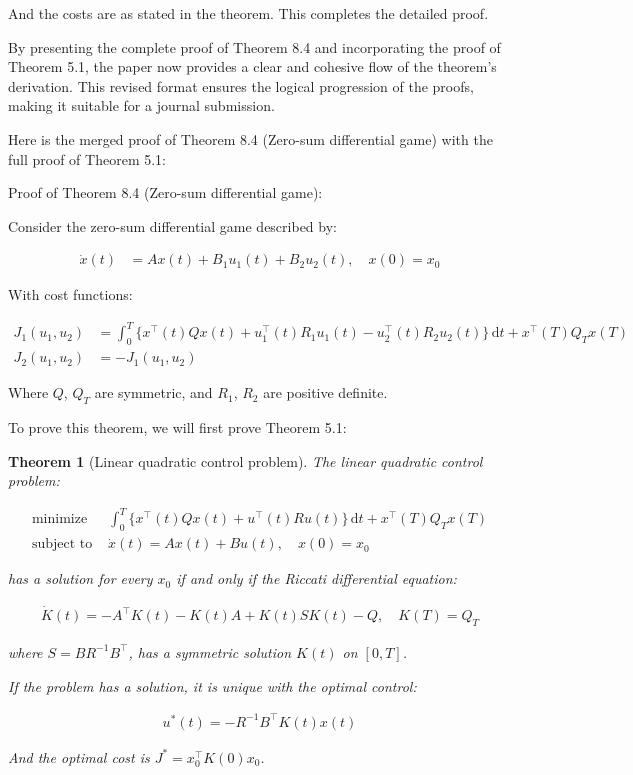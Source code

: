 \documentclass[3p]{elsarticle}
\newtheorem{theorem}{Theorem}
\begin{document}
And the costs are as stated in the theorem. This completes the detailed proof.

By presenting the complete proof of Theorem 8.4 and incorporating the proof of Theorem 5.1, the paper now provides a clear and cohesive flow of the theorem's derivation. This revised format ensures the logical progression of the proofs, making it suitable for a journal submission.







Here is the merged proof of Theorem 8.4 (Zero-sum differential game) with the full proof of Theorem 5.1:

Proof of Theorem 8.4 (Zero-sum differential game):

Consider the zero-sum differential game described by:

\begin{align*}
\dot{x}(t) &= Ax(t) + B_1u_1(t) + B_2u_2(t), \quad x(0)=x_0
\end{align*}

With cost functions:

\begin{align*}
J_1(u_1,u_2) &= \int_0^T \{x^\top (t)Qx(t) + u_1^\top(t) R_1u_1(t) - u_2^\top(t)R_2u_2(t)\}\,\mathrm{d}t + x^\top(T)Q_Tx(T) \\
J_2(u_1,u_2) &= -J_1(u_1,u_2)
\end{align*}

Where $Q$, $Q_T$ are symmetric, and $R_1$, $R_2$ are positive definite.

To prove this theorem, we will first prove Theorem 5.1:

\begin{theorem}[Linear quadratic control problem]
The linear quadratic control problem:

\begin{align*}
\text{minimize } &\int_0^T\{x^\top(t) Q x(t) + u^\top(t) R u(t)\}\,\mathrm{d}t + x^\top(T)Q_Tx(T) \\
\text{subject to } &\dot{x}(t) = Ax(t) + Bu(t), \quad x(0) = x_0  
\end{align*}

has a solution for every $x_0$ if and only if the Riccati differential equation:

\begin{align*}
\dot{K}(t) = -A^\top K(t) - K(t)A + K(t)SK(t) - Q, \quad K(T) = Q_T  
\end{align*}

where $S=BR^{-1}B^\top$, has a symmetric solution $K(t)$ on $[0,T]$. 

If the problem has a solution, it is unique with the optimal control:

\begin{align*}
u^*(t) = -R^{-1}B^\top K(t) x(t)
\end{align*}

And the optimal cost is $J^* = x_0^\top K(0) x_0$.
\end{theorem}
\end{document}
